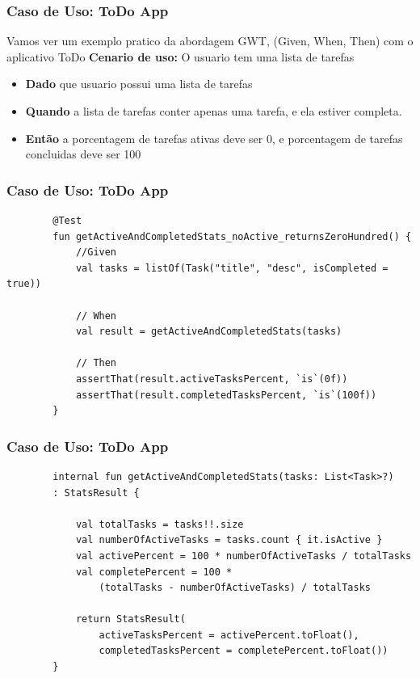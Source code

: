 \documentclass{beamer}
\begin{document}
\begin{frame}
\frametitle{Caso de Uso: ToDo App}
Vamos ver um exemplo pratico da abordagem GWT, (Given, When, Then) com o aplicativo ToDo
\newline \textbf{Cenario de uso:} O usuario tem uma lista de tarefas
\begin{itemize}
\item \textbf{Dado} que usuario possui uma lista de tarefas
\item \textbf{Quando} a lista de tarefas conter apenas uma tarefa, e ela estiver completa.
\item \textbf{Então} a porcentagem de tarefas ativas deve ser 0, e porcentagem de tarefas concluidas deve ser 100
\end{itemize}
\end{frame}

\begin{frame}[fragile]
	\frametitle{Caso de Uso: ToDo App}
	\begin{example}
		\begin{lstlisting}
		@Test
		fun getActiveAndCompletedStats_noActive_returnsZeroHundred() {
			//Given
			val tasks = listOf(Task("title", "desc", isCompleted = true))
			
			// When 
			val result = getActiveAndCompletedStats(tasks)
		
			// Then 
			assertThat(result.activeTasksPercent, `is`(0f))
			assertThat(result.completedTasksPercent, `is`(100f))
		}
		\end{lstlisting}
	\end{example}
\end{frame}

\begin{frame}[fragile]
	\frametitle{Caso de Uso: ToDo App}
	\begin{example}
		\begin{lstlisting}
		internal fun getActiveAndCompletedStats(tasks: List<Task>?)
		: StatsResult {
		
			val totalTasks = tasks!!.size
			val numberOfActiveTasks = tasks.count { it.isActive }
			val activePercent = 100 * numberOfActiveTasks / totalTasks
			val completePercent = 100 * 
				(totalTasks - numberOfActiveTasks) / totalTasks
		
			return StatsResult(
				activeTasksPercent = activePercent.toFloat(),
				completedTasksPercent = completePercent.toFloat())
		}
		\end{lstlisting}
	\end{example}
\end{frame}
\end{document}
